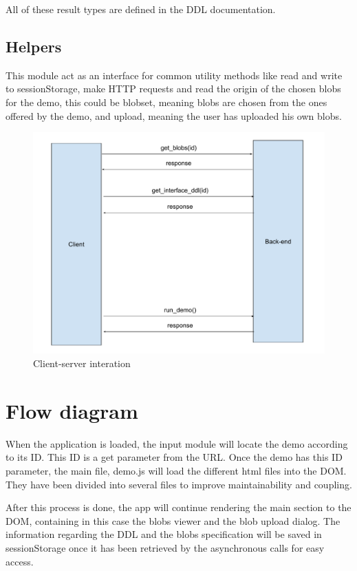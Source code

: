 All of these result types are defined in the DDL documentation.


\subsection{Helpers}
This module act as an interface for common utility methods like read and write to sessionStorage, make HTTP requests and 
read the origin of the chosen blobs for the demo, this could be blobset, meaning blobs are chosen from the ones offered by the 
demo, and upload, meaning the user has uploaded his own blobs.

\begin{figure}[ht]
	\centering
	\includegraphics[width=\textwidth]{images/client_server_interaction}
	\caption{Client-server interation} 
	\label{fig:server_interaction}
\end{figure}


\section{Flow diagram}
When the application is loaded, the input module will locate the demo according to its ID. This ID is a get parameter from the URL.
Once the demo has this ID parameter, the main file, demo.js will load the different html files into the DOM. They have been divided 
into several files to improve maintainability and coupling.

After this process is done, the app will continue rendering the main section to the DOM, containing in this case the blobs viewer and 
the blob upload dialog. The information regarding the DDL and the blobs specification will be saved in sessionStorage once it has been retrieved by the asynchronous calls for easy access.

